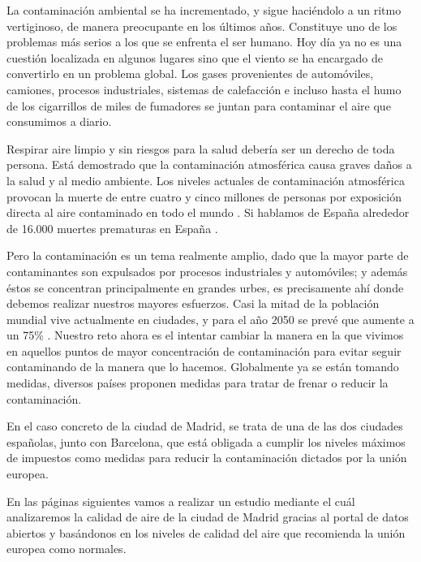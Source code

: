 
La contaminación ambiental se ha incrementado, y sigue haciéndolo a un ritmo vertiginoso, de manera preocupante en los últimos años. Constituye uno de los problemas más serios a los que se enfrenta el ser humano. Hoy día ya no es una cuestión localizada en algunos lugares sino que el viento se ha encargado de convertirlo en un problema global. Los gases provenientes de automóviles, camiones, procesos industriales, sistemas de calefacción e incluso hasta el humo de los cigarrillos de miles de fumadores se juntan para contaminar el aire que consumimos a diario. 

Respirar aire limpio y sin riesgos para la salud debería ser un derecho de toda persona. Está demostrado que la contaminación atmosférica causa graves daños a la salud y al medio ambiente. Los niveles actuales de contaminación atmosférica provocan la muerte de entre cuatro y cinco millones de personas por exposición directa al aire contaminado en todo el mundo \cite{sharma_anirudh_anirudh_2018}. Si hablamos de España alrededor de 16.000 muertes prematuras en España \cite{informe_EeA_2019}.

Pero la contaminación es un tema realmente amplio, dado que la mayor parte de contaminantes son expulsados por procesos industriales y automóviles; y además éstos se concentran principalmente en grandes urbes, es precisamente ahí donde debemos realizar nuestros mayores esfuerzos. Casi la mitad de la población mundial vive actualmente en ciudades, y para el año 2050 se prevé que aumente a un 75\% \cite{bbc_ciudades}. Nuestro reto ahora es el intentar cambiar la manera en la que vivimos en aquellos puntos de mayor concentración de contaminación para evitar seguir contaminando de la manera que lo hacemos. Globalmente ya se están tomando medidas, diversos países proponen medidas para tratar de frenar o reducir la contaminación. 

En el caso concreto de la ciudad de Madrid, se trata de una de las dos ciudades españolas, junto con Barcelona, que está obligada a cumplir los niveles máximos de  impuestos como medidas para reducir la contaminación dictados por la unión europea.

En las páginas siguientes vamos a realizar un estudio mediante el cuál analizaremos la calidad de aire de la ciudad de Madrid gracias al portal de datos abiertos y basándonos en los niveles de calidad del aire que recomienda la unión europea como normales.